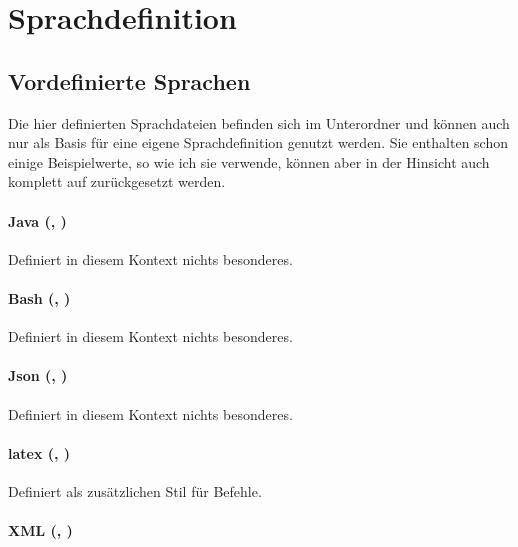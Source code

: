 \documentclass{sopra-base}
\begin{document}
\appendix
\section{Sprachdefinition}

\subsection{Vordefinierte Sprachen}
\label{sec:vordefinierteSprachen}

Die hier definierten Sprachdateien befinden sich im Unterordner  und können auch nur als Basis für eine eigene Sprachdefinition genutzt werden. Sie enthalten schon einige Beispielwerte, so wie ich sie verwende, können aber in der Hinsicht auch komplett
auf  zurückgesetzt werden. 

\paragraph{Java (, )}

Definiert in diesem Kontext nichts besonderes.

\paragraph{Bash (, )}

Definiert in diesem Kontext nichts besonderes.

\paragraph{Json (, )}

Definiert in diesem Kontext nichts besonderes.

\paragraph{latex (, )}

Definiert  als zusätzlichen Stil für Befehle.

\paragraph{XML (, )}
\end{document}
